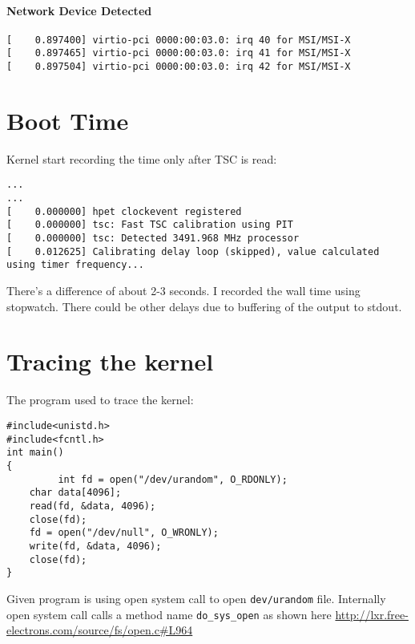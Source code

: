 \documentclass[10pt] {article}
\begin{document}
\paragraph{Network Device Detected}
\begin{verbatim}
[    0.897400] virtio-pci 0000:00:03.0: irq 40 for MSI/MSI-X
[    0.897465] virtio-pci 0000:00:03.0: irq 41 for MSI/MSI-X
[    0.897504] virtio-pci 0000:00:03.0: irq 42 for MSI/MSI-X
\end{verbatim}


\section{Boot Time}
Kernel start recording the time only after TSC is read:
\begin{lstlisting}
...
...
[    0.000000] hpet clockevent registered
[    0.000000] tsc: Fast TSC calibration using PIT
[    0.000000] tsc: Detected 3491.968 MHz processor
[    0.012625] Calibrating delay loop (skipped), value calculated using timer frequency...
\end{lstlisting}
There's a difference of about 2-3 seconds. I recorded the wall time using stopwatch. There could be other delays due to buffering of the output to stdout.


\section{Tracing the kernel}
The program used to trace the kernel:
\begin{verbatim}
#include<unistd.h>
#include<fcntl.h>
int main()
{
         int fd = open("/dev/urandom", O_RDONLY);
	char data[4096];
	read(fd, &data, 4096);
	close(fd);
	fd = open("/dev/null", O_WRONLY);
	write(fd, &data, 4096);
	close(fd);
} 
\end{verbatim}
Given program is using open system call to open \texttt{dev/urandom} file. Internally open system call calls a method name \texttt{do\_sys\_open} as shown here \url{http://lxr.free-electrons.com/source/fs/open.c#L964} \\
\end{document}
